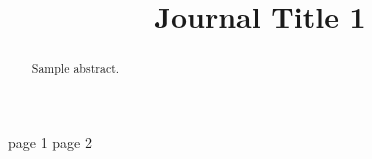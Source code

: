 \documentclass[a4paper]{IEEEtran}
\title{Journal Title 1}
\author{
\IEEEauthorblockN{Last1, First1}
\IEEEauthorblockA{}
\and
\IEEEauthorblockN{Last2, First2}
\IEEEauthorblockA{}
}
\begin{document}
\maketitle
\begin{abstract}
Sample abstract.
\end{abstract}
page 1
\cleardoublepage
page 2
\end{document}
